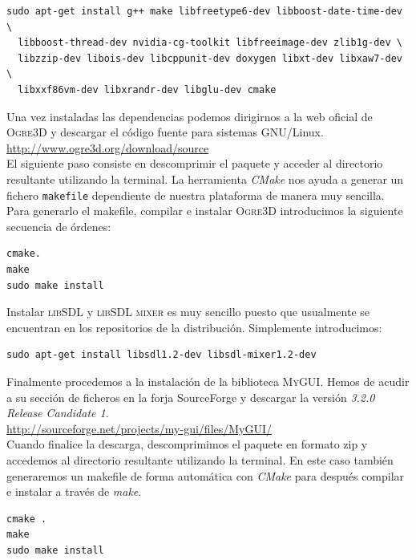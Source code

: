 \documentclass[a4paper,11pt]{article}
\begin{document}
\begin{lstlisting}[style=consola]
sudo apt-get install g++ make libfreetype6-dev libboost-date-time-dev \
  libboost-thread-dev nvidia-cg-toolkit libfreeimage-dev zlib1g-dev \
  libzzip-dev libois-dev libcppunit-dev doxygen libxt-dev libxaw7-dev \
  libxxf86vm-dev libxrandr-dev libglu-dev cmake
\end{lstlisting}

Una vez instaladas las dependencias podemos dirigirnos a la web oficial
de \textsc{Ogre3D} y descargar el código fuente para sistemas GNU/Linux.\\

\url{http://www.ogre3d.org/download/source}\\

El siguiente paso consiste en descomprimir el paquete y acceder al directorio
resultante utilizando la terminal. La herramienta \textit{CMake} nos ayuda
a generar un fichero \texttt{makefile} dependiente de nuestra plataforma
de manera muy sencilla. Para generarlo el makefile, compilar e instalar
\textsc{Ogre3D} introducimos la siguiente secuencia de órdenes:

\begin{lstlisting}[style=consola]
cmake.
make
sudo make install
\end{lstlisting}

Instalar \textsc{libSDL} y \textsc{libSDL mixer} es muy sencillo puesto
que usualmente se encuentran en los repositorios de la distribución. Simplemente
introducimos:

\begin{lstlisting}[style=consola]
sudo apt-get install libsdl1.2-dev libsdl-mixer1.2-dev
\end{lstlisting}

Finalmente procedemos a la instalación de la biblioteca \textsc{MyGUI}.
Hemos de acudir a su sección de ficheros en la forja SourceForge y descargar
la versión \textit{3.2.0 Release Candidate 1}.\\

\url{http://sourceforge.net/projects/my-gui/files/MyGUI/}\\

Cuando finalice la descarga, descomprimimos el paquete en formato zip y
accedemos al directorio resultante utilizando la terminal. En este caso
también generaremos un makefile de forma automática con \textit{CMake}
para después compilar e instalar a través de \textit{make}.

\begin{lstlisting}[style=consola]
cmake .
make
sudo make install
\end{lstlisting}
\end{document}
